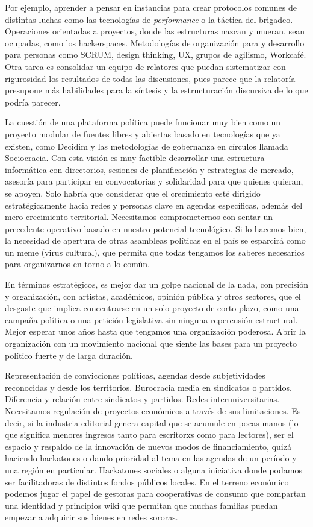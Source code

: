 Por ejemplo, aprender a pensar en instancias para crear protocolos comunes de distintas luchas como las tecnologías de \emph{performance} o la táctica del brigadeo. Operaciones orientadas a proyectos, donde las estructuras nazcan y mueran, sean ocupadas, como los hackerspaces. Metodologías de organización para y desarrollo para personas como SCRUM, design thinking, UX, grupos de agilismo, Workcafé. Otra tarea es consolidar un equipo de relatores que puedan sistematizar con rigurosidad los resultados de todas las discusiones, pues parece que la relatoría presupone más habilidades para la síntesis y la estructuración discursiva de lo que podría parecer.

La cuestión de una plataforma política puede funcionar muy bien como un proyecto modular de fuentes libres y abiertas basado en tecnologías que ya existen, como Decidim y las metodologías de gobernanza en círculos llamada Sociocracia. Con esta visión es muy factible desarrollar una estructura informática con directorios, sesiones de planificación y estrategias de mercado, asesoría para participar en convocatorias y solidaridad para que quienes quieran, se apoyen. Solo habría que considerar que el crecimiento esté dirigido estratégicamente hacia redes y personas clave en agendas específicas, además del mero crecimiento territorial. Necesitamos comprometernos con sentar un precedente operativo basado en nuestro potencial tecnológico. Si lo hacemos bien, la necesidad de apertura de otras asambleas políticas en el país se esparcirá como un meme (virus cultural), que permita que todas tengamos los saberes necesarios para organizarnos en torno a lo común.

En términos estratégicos, es mejor dar un golpe nacional de la nada, con precisión y organización, con artistas, académicos, opinión pública y otros sectores, que el desgaste que implica concentrarse en un solo proyecto de corto plazo, como una campaña política o una petición legislativa sin ninguna repercusión estructural. Mejor esperar unos años hasta que tengamos una organización poderosa. Abrir la organización con un movimiento nacional que siente las bases para un proyecto político fuerte y de larga duración.

Representación de convicciones políticas, agendas desde subjetividades reconocidas y desde los territorios. Burocracia media en sindicatos o partidos. Diferencia y relación entre sindicatos y partidos. Redes interuniversitarias. Necesitamos regulación de proyectos económicos a través de sus limitaciones. Es decir, si la industria editorial genera capital que se acumule en pocas manos (lo que significa menores ingresos tanto para escritorxs como para lectores), ser el espacio y respaldo de la innovación de nuevos modos de financiamiento, quizá haciendo hackatones o dando prioridad al tema en las agendas de un período y una región en particular. Hackatones sociales o alguna iniciativa donde podamos ser facilitadoras de distintos fondos públicos locales. En el terreno económico podemos jugar el papel de gestoras para cooperativas de consumo que compartan una identidad y principios wiki que permitan que muchas familias puedan empezar a adquirir sus bienes en redes sororas.

